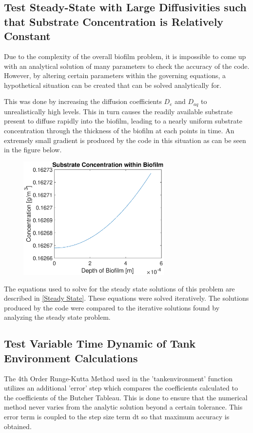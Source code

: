 \documentclass[letterpaper, twoside]{article}
\numberwithin{equation}{section}
\begin{document}
\subsection{Test Steady-State with Large Diffusivities such that Substrate Concentration is Relatively Constant}

Due to the complexity of the overall biofilm problem, it is impossible to come up with an analytical solution of many parameters to check the accuracy of the code. However, by altering certain parameters within the governing equations, a hypothetical situation can be created that can be solved analytically for.

This was done by increasing the diffusion coefficients $D_e$ and $D_{aq}$ to unrealistically high levels. This in turn causes the readily available substrate present to diffuse rapidly into the biofilm, leading to a nearly uniform substrate concentration through the thickness of the biofilm at each points in time. An extremely small gradient is produced by the code in this situation as can be seen in the figure below.

\begin{figure}[H]
  \centering
  \includegraphics[read=eps, width=3in]{SteadyState_Figure1.eps}
\end{figure}

The equations used to solve for the steady state solutions of this problem are described in \ref{Steady State}. These equations were solved iteratively. The solutions produced by the code were compared to the iterative solutions found by analyzing the steady state problem.


\subsection{Test Variable Time Dynamic of Tank Environment Calculations}
The 4th Order Runge-Kutta Method used in the 'tankenvironment' function utilizes an additional 'error' step which compares the coefficients calculated to the coefficients of the Butcher Tableau. This is done to ensure that the numerical method never varies from the analytic solution beyond a certain tolerance. This error term is coupled to the step size term dt so that maximum accuracy is obtained. 
\end{document}
